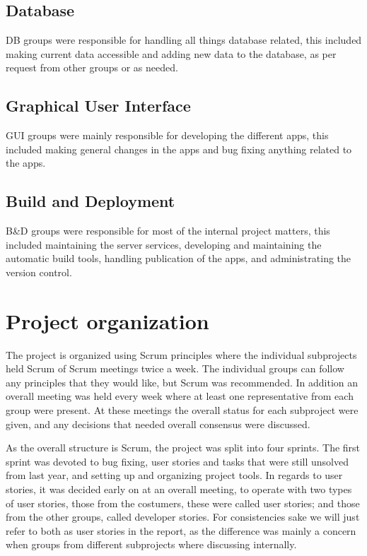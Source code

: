 \subsection{Database}
DB groups were responsible for handling all things database related, this included making current data accessible and adding new data to the database, as per request from other groups or as needed.

\subsection{Graphical User Interface}
GUI groups were mainly responsible for developing the different apps, this included making general changes in the apps and bug fixing anything related to the apps.

\subsection{Build and Deployment}
B\&D groups were responsible for most of the internal project matters, this included maintaining the server services, developing and maintaining the automatic build tools, handling publication of the apps, and administrating the version control.

\section{Project organization}
The project is organized using Scrum principles where the individual subprojects held Scrum of Scrum meetings twice a week. The individual groups can follow any principles that they would like, but Scrum was recommended.
In addition an overall meeting was held every week where at least one representative from each group were present. At these meetings the overall status for each subproject were given, and any decisions that needed overall consensus were discussed.

As the overall structure is Scrum, the project was split into four sprints. The first sprint was devoted to bug fixing, user stories and tasks that were still unsolved from last year, and setting up and organizing project tools. In regards to user stories, it was decided early on at an overall meeting, to operate with two types of user stories, those from the costumers, these were called user stories; and those from the other groups, called developer stories. For consistencies sake we will just refer to both as user stories in the report, as the difference was mainly a concern when groups from different subprojects where discussing internally.

